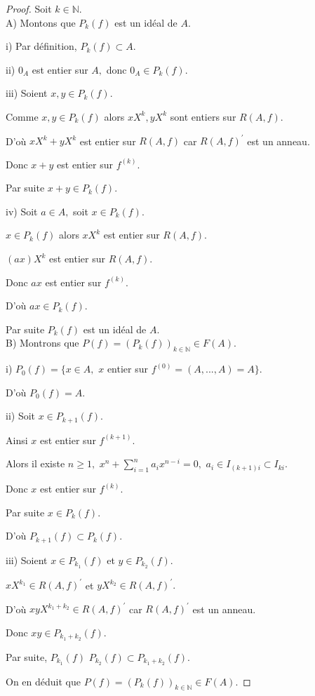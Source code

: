 \begin{proof}
	Soit $k\in \mathbb{N}.$ \\
	A) Montons que $P_{k}(f)$ est un idéal de $A$.
	
	i) Par définition, $P_{k}(f)\subset A.$
	
	ii) $0_{A}$ est entier sur $A,$ donc $0_{A}\in P_{k}(f)$.
	
	iii) Soient $x,y\in P_{k}(f).$
	
	Comme $x,y\in P_{k}(f)$ alors $xX^{k},yX^{k}$ sont entiers sur $R(A,f)$.
	
	D'où $xX^{k}+yX^{k}$ est entier sur $R(A,f)$ car $R(A,f)^{\prime }$ est
	un anneau.
	
	Donc $x+y$ est entier sur $f^{(k)}$.
	
	Par suite $x+y\in P_{k}(f).$
	
	iv) Soit $a\in A,$ soit $x\in P_{k}(f).$
	
	$x\in P_{k}(f)$ alors $xX^{k}$ est entier sur $R(A,f).$
	
	$(ax)X^{k}$ est entier sur $R(A,f)$.
	
	Donc $ax$ est entier sur $f^{(k)}$.
	
	D'où $ax\in P_{k}(f)$.
	
	Par suite $P_{k}(f)$ est un idéal de $A.$ \\
	B) Montrons que $P(f)=(P_{k}(f))_{k\in \mathbb{N}}\in F(A)$.
	
	i) $P_{0}(f)=\{x\in A,$ $x$ entier sur $f^{(0)}=(A,...,A)=A\}$.
	
	D'où $P_{0}(f)=A$.
	
	ii) Soit $x\in P_{k+1}(f).$
	
	Ainsi $x$ est entier sur $f^{(k+1)}.$
	
	Alors il existe $n\geq 1,$ $x^{n}+\sum\limits_{i=1}^{n}a_{i}x^{n-i}=0,$ $
	a_{i}\in I_{(k+1)i}\subset I_{ki}$.
	
	Donc $x$ est entier sur $f^{(k)}$.
	
	Par suite $x\in P_{k}(f).$
	
	D'où $P_{k+1}(f)\subset P_{k}(f).$
	
	iii) Soient $x\in P_{k_{1}}(f)$ et $y\in P_{k_{2}}(f)$.
	
	$xX^{k_{1}}\in R(A,f)^{\prime }$ et $yX^{k_{2}}\in R(A,f)^{\prime }.$
	
	D'où $xyX^{k_{1}+k_{2}}\in R(A,f)^{\prime }$ car $R(A,f)^{\prime }$ est
	un anneau.
	
	Donc $xy\in P_{k_{1}+k_{2}}(f)$.
	
	Par suite, $P_{k_{1}}(f)$ $P_{k_{2}}(f)\subset P_{k_{1}+k_{2}}(f).$
	
	On en déduit que $P(f)=(P_{k}(f))_{k\in \mathbb{N}}\in F(A).$
\end{proof}
